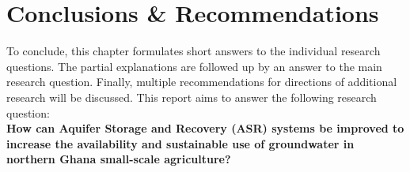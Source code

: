 \chapter{Conclusions \& Recommendations}
\label{chapter:conclusions}
To conclude, this chapter formulates short answers to the individual research questions. The partial explanations are followed up by an answer to the main research question. Finally, multiple recommendations for directions of additional research will be discussed. This report aims to answer the following research question: \\

%
%
% 
\textbf{How can Aquifer Storage and Recovery (ASR) systems be improved to increase the availability and sustainable use of groundwater in northern Ghana small-scale agriculture?} \\

